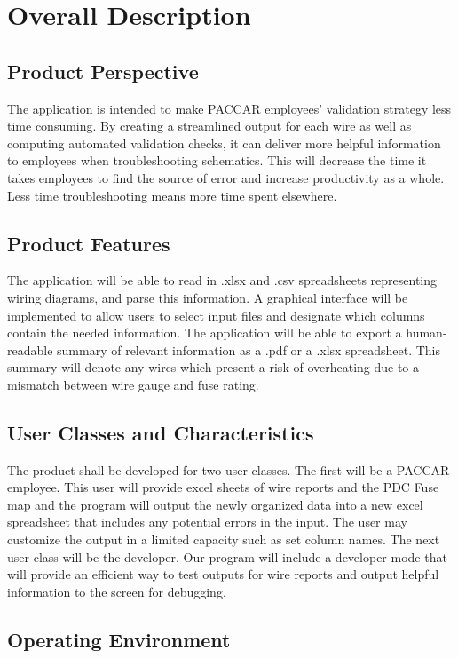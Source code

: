 \section{Overall Description}



\subsection{Product Perspective}
 The application is intended to make PACCAR employees' validation strategy less time consuming. By creating a streamlined output for each wire as well as computing automated validation checks, it can deliver more helpful information to employees when troubleshooting schematics. This will decrease the time it takes employees to find the source of error and increase productivity as a whole. Less time troubleshooting means more time spent elsewhere.

\subsection{Product Features}
 The application will be able to read in .xlsx and .csv spreadsheets representing wiring diagrams, and parse this information. A graphical interface will be implemented to allow users to select input files and designate which columns contain the needed information. The application will be able to export a human-readable summary of relevant information as a .pdf or a .xlsx spreadsheet. This summary will denote any wires which present a risk of overheating due to a mismatch between wire gauge and fuse rating. 

\subsection{User Classes and Characteristics}
  The product shall be developed for two user classes. The first will be a PACCAR employee. This user will provide excel sheets of wire reports and the PDC Fuse map and the program will output the newly organized data into a new excel spreadsheet that includes any potential errors in the input. The user may customize the output in a limited capacity such as set column names. The next user class will be the developer. Our program will include a developer mode that will provide an efficient way to test outputs for wire reports and output helpful information to the screen for debugging.  

\subsection{Operating Environment}

